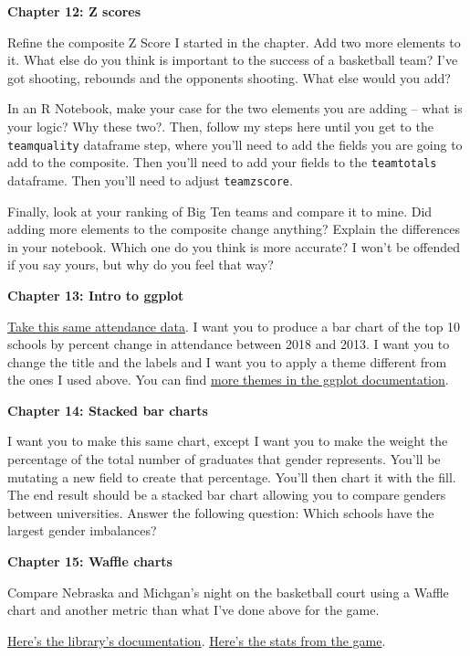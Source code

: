 \documentclass[
]{book}
\begin{document}
\textbf{Chapter 12: Z scores}

Refine the composite Z Score I started in the chapter. Add two more elements to it. What else do you think is important to the success of a basketball team? I've got shooting, rebounds and the opponents shooting. What else would you add?

In an R Notebook, make your case for the two elements you are adding -- what is your logic? Why these two?. Then, follow my steps here until you get to the \texttt{teamquality} dataframe step, where you'll need to add the fields you are going to add to the composite. Then you'll need to add your fields to the \texttt{teamtotals} dataframe. Then you'll need to adjust \texttt{teamzscore}.

Finally, look at your ranking of Big Ten teams and compare it to mine. Did adding more elements to the composite change anything? Explain the differences in your notebook. Which one do you think is more accurate? I won't be offended if you say yours, but why do you feel that way?

\textbf{Chapter 13: Intro to ggplot}

\href{https://unl.box.com/s/hvxmnxhr41x4ikgt3vk38aczcbrf97pn}{Take this same attendance data}. I want you to produce a bar chart of the top 10 schools by percent change in attendance between 2018 and 2013. I want you to change the title and the labels and I want you to apply a theme different from the ones I used above. You can find \href{https://ggplot2.tidyverse.org/reference/ggtheme.html}{more themes in the ggplot documentation}.

\textbf{Chapter 14: Stacked bar charts}

I want you to make this same chart, except I want you to make the weight the percentage of the total number of graduates that gender represents. You'll be mutating a new field to create that percentage. You'll then chart it with the fill. The end result should be a stacked bar chart allowing you to compare genders between universities. Answer the following question: Which schools have the largest gender imbalances?

\textbf{Chapter 15: Waffle charts}

Compare Nebraska and Michgan's night on the basketball court using a Waffle chart and another metric than what I've done above for the game.

\href{https://github.com/hrbrmstr/waffle}{Here's the library's documentation}.
\href{https://www.sports-reference.com/cbb/boxscores/2019-02-28-19-michigan.html}{Here's the stats from the game}.
\end{document}
